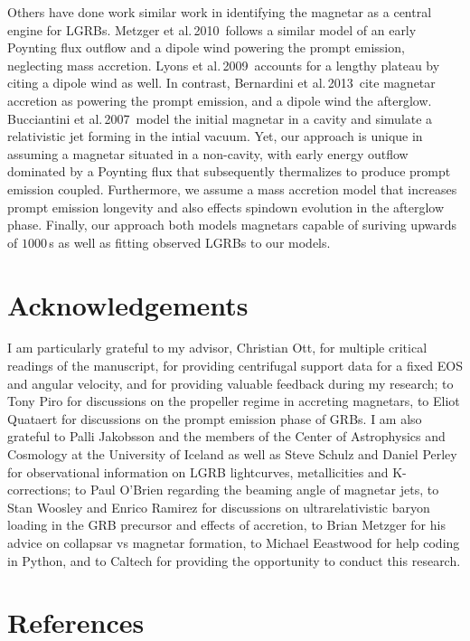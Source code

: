 \documentclass{article}
\begin{document}
Others have done work similar work in identifying the magnetar as a central engine for LGRBs. Metzger et al.\,2010\,\cite{Metzger:2010pp} follows a similar model of an early Poynting flux outflow and a dipole wind powering the prompt emission, neglecting mass accretion. Lyons et al.\,2009\,\cite{Lyons:2009ka} accounts for a lengthy plateau by citing a dipole wind as well. In contrast, Bernardini et al.\,2013\,\cite{Bernardini:2013nfa} cite magnetar accretion as powering the prompt emission, and a dipole wind the afterglow. Bucciantini et al.\,2007\,\cite{Bucciantini:2007hy} model the initial magnetar in a cavity and simulate a relativistic jet forming in the intial vacuum. Yet, our approach is unique in assuming a magnetar situated in a non-cavity, with early energy outflow dominated by a Poynting flux that subsequently thermalizes to produce prompt emission coupled. Furthermore, we assume a mass accretion model that increases prompt emission longevity and also effects spindown evolution in the afterglow phase. Finally, our approach both models magnetars capable of suriving upwards of $1000$\,s as well as fitting observed LGRBs to our models.

\section{Acknowledgements}
I am particularly grateful to my advisor, Christian Ott, for multiple critical readings of the manuscript, for providing centrifugal support data for a fixed EOS and angular velocity, and for providing valuable feedback during my research; to Tony Piro for discussions on the propeller regime in accreting magnetars, to Eliot Quataert for discussions on the prompt emission phase of GRBs. I am also grateful to Palli Jakobsson and the members of the Center of Astrophysics and Cosmology at the University of Iceland as well as Steve Schulz and Daniel Perley for observational information on LGRB lightcurves,  metallicities and K-corrections; to Paul O'Brien regarding the beaming angle of magnetar jets, to Stan Woosley and Enrico Ramirez for discussions on ultrarelativistic baryon loading in the GRB precursor and effects of accretion, to Brian Metzger for his advice on collapsar vs magnetar formation, to Michael Eeastwood for help coding in Python, and to Caltech for providing the opportunity to conduct this research.
\newpage
\clearpage
\renewcommand*{\refname}{}
\section{References}


\end{document}
